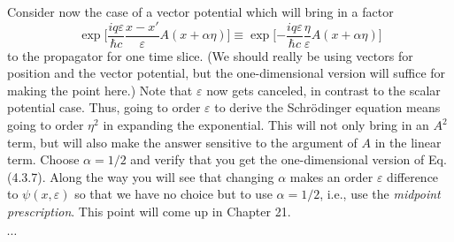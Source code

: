 \documentclass[../principles-of-quantum-mechanics.tex]{subfiles}
\begin{document}
\begin{questions}
		Consider now the case of a vector potential which will bring in a factor
		$$\exp\Big[\frac{iq\varepsilon}{\hbar c}\frac{x - x'}{\varepsilon}A(x + \alpha\eta)\Big] \equiv \exp\Big[{-\frac{iq\varepsilon}{\hbar c}}\frac{\eta}{\varepsilon}A(x + \alpha\eta)\Big]$$
		to the propagator for one time slice. (We should really be using vectors for position and the vector potential, but the one-dimensional version will suffice for making the point here.) Note that $\varepsilon$ now gets canceled, in contrast to the scalar potential case. Thus, going to order $\varepsilon$ to derive the Schr\"odinger equation means going to order $\eta^2$ in expanding the exponential. This will not only bring in an $A^2$ term, but will also make the answer sensitive to the argument of $A$ in the linear term. Choose $\alpha = 1/2$ and verify that you get the one-dimensional version of Eq. (4.3.7). Along the way you will see that changing $\alpha$ makes an order $\varepsilon$ difference to $\psi(x, \varepsilon)$ so that we have no choice but to use $\alpha = 1/2$, i.e., use the \textit{midpoint prescription}. This point will come up in Chapter 21.
		\begin{solution}
			$\cdots$
		\end{solution}
		
	\end{questions}
\end{document}
